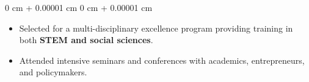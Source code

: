\documentclass[10pt, letterpaper]{article}
\newenvironment{highlights}{
    \begin{itemize}[
        topsep=0.10 cm,
        parsep=0.10 cm,
        partopsep=0pt,
        itemsep=0pt,
        leftmargin=0 cm + 10pt
    ]
}{
    \end{itemize}
} %
\newenvironment{onecolentry}{
    \begin{adjustwidth}{
        0 cm + 0.00001 cm
    }{
        0 cm + 0.00001 cm
    }
}{
    \end{adjustwidth}
} %
\begin{document}
        \vspace{0.1 cm}
        
        \begin{onecolentry}
            \begin{highlights}
                \item Selected for a multi-disciplinary excellence program providing training in both \textbf{STEM and social sciences}.
                \item Attended intensive seminars and conferences with academics, entrepreneurs, and policymakers.
            \end{highlights}
        \end{onecolentry}

        \vspace{0.2 cm}
    
\end{document}
